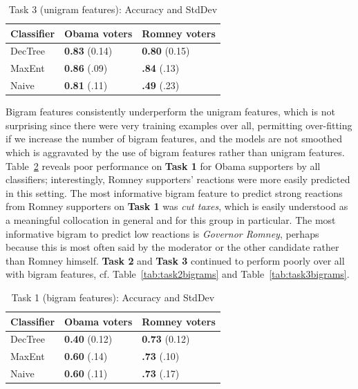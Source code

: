 \begin{table}[]
\begin{centering}
\begin{tabular}{ l | l | l }
Classifier & Obama voters & Romney voters \\
\hline
DecTree & \textbf{0.83} (0.14) &  \textbf{0.80} (0.15) \\
MaxEnt & \textbf{0.86} (.09) &  \textbf{.84} (.13) \\
Naive & \textbf{0.81} (.11) &  \textbf{.49} (.23) \\
\end{tabular}
\caption{Task 3 (unigram features): Accuracy and StdDev}
\label{tab:task3unigrams}
\end{centering}
\end{table}

Bigram features consistently underperform the unigram features, which is not surprising since there were very training examples over all, permitting over-fitting if we increase the number of bigram features, and the models are not smoothed which is aggravated by the use of bigram features rather than unigram features.  Table~\ref{tab:task1bigrams} reveals poor performance on \textbf{Task 1} for Obama supporters by all classifiers; interestingly, Romney supporters' reactions were more easily predicted in this setting.  The most informative bigram feature to predict strong reactions from Romney supporters on \textbf{Task 1} was \emph{cut taxes}, which is easily understood as a meaningful collocation in general and for this group in particular. The most informative bigram to predict low reactions is \emph{Governor Romney}, perhaps because this is most often said by the moderator or the other candidate rather than Romney himself.  \textbf{Task 2} and \textbf{Task 3} continued to perform poorly over all with bigram features, cf. Table~\ref{tab:task2bigrams} and Table~\ref{tab:task3bigrams}.

\begin{table}[H]
\begin{centering}
\begin{tabular}{ l | l | l }
Classifier & Obama voters & Romney voters \\
\hline
DecTree & \textbf{0.40} (0.12) &  \textbf{0.73} (0.12) \\
MaxEnt & \textbf{0.60} (.14) &  \textbf{.73} (.10) \\
Naive & \textbf{0.60} (.11) &  \textbf{.73} (.17) \\
\end{tabular}
\caption{Task 1 (bigram features): Accuracy and StdDev}
\label{tab:task1bigrams}
\end{centering}
\end{table}

